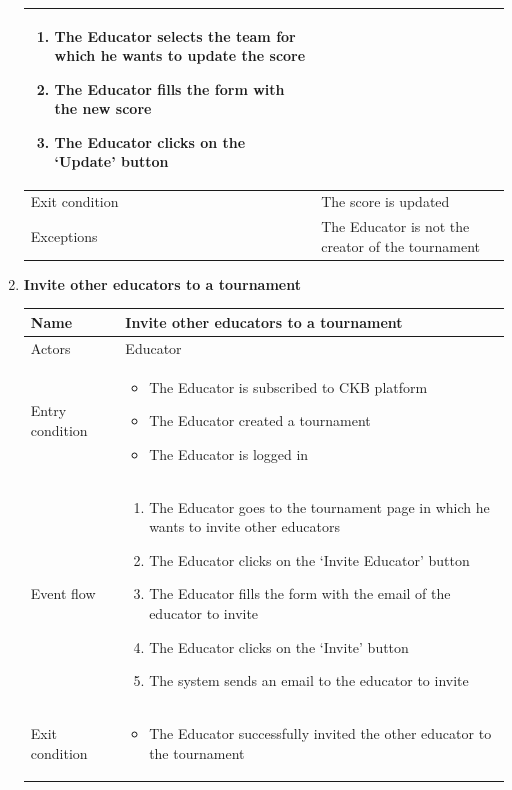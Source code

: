 \begin{enumerate}[label=UC\arabic*:]
\begin{tabular}{|p{3cm}|p{8cm}|}
\begin{enumerate}[label=\arabic*.]
            \item The Educator selects the team for which he wants to update the score
            \item The Educator fills the form with the new score
            \item The Educator clicks on the `Update' button
        \end{enumerate}
        \\
        \hline
        Exit condition & The score is updated \\
        \hline
        Exceptions & The Educator is not the creator of the tournament \\
        \hline
    \end{tabular}
    \item \textbf{Invite other educators to a tournament} \\
    \begin{tabular}{|p{3cm}|p{8cm}|}
        \hline
        Name & Invite other educators to a tournament \\
        \hline
        Actors & Educator \\
        \hline
        Entry condition &
        \begin{itemize}
            \item The Educator is subscribed to CKB platform
            \item The Educator created a tournament
            \item The Educator is logged in
        \end{itemize}
        \\
        \hline
        Event flow & 
        \begin{enumerate}[label=\arabic*.]
            \item The Educator goes to the tournament page in which he wants to invite other educators
            \item The Educator clicks on the `Invite Educator' button
            \item The Educator fills the form with the email of the educator to invite
            \item The Educator clicks on the `Invite' button
            \item The system sends an email to the educator to invite
        \end{enumerate}
        \\
        \hline
        Exit condition &
        \begin{itemize}
            \item The Educator successfully invited the other educator to the tournament

\end{itemize}
\end{tabular}
\end{enumerate}
